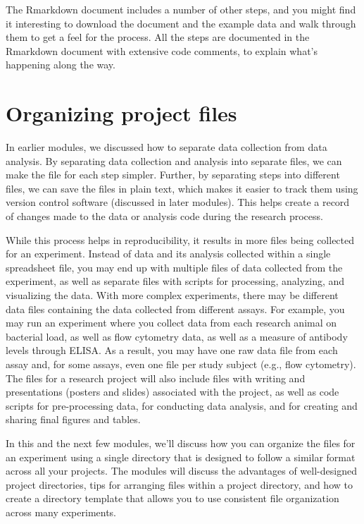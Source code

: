 \documentclass[]{tufte-book}
\begin{document}
The Rmarkdown document includes a number of other steps, and you might find
it interesting to download the document and the example data and walk through
them to get a feel for the process. All the steps are documented in the
Rmarkdown document with extensive code comments, to explain what's happening
along the way.

\section{Organizing project files}\label{module6}

In earlier modules, we discussed how to separate data collection from data
analysis. By separating data collection and analysis into separate files, we can
make the file for each step simpler. Further, by separating steps into different
files, we can save the files in plain text, which makes it easier to track them
using version control software (discussed in later modules). This helps create a
record of changes made to the data or analysis code during the research process.

While this process helps in reproducibility, it results in more files being
collected for an experiment. Instead of data and its analysis collected within a
single spreadsheet file, you may end up with multiple files of data collected
from the experiment, as well as separate files with scripts for processing,
analyzing, and visualizing the data. With more complex experiments, there may be
different data files containing the data collected from different assays. For example,
you may run an experiment where you collect data from each research animal on
bacterial load, as well as flow cytometry data, as well as a measure of antibody
levels through ELISA. As a result, you may have one raw data file from each
assay and, for some assays, even one file per study subject (e.g., flow
cytometry). The files for a research project will also include files with
writing and presentations (posters and slides) associated with the project, as
well as code scripts for pre-processing data, for conducting data analysis, and
for creating and sharing final figures and tables.

In this and the next few modules, we'll discuss how you can organize the files
for an experiment using a single directory that is designed to follow a similar
format across all your projects. The modules will discuss the advantages of
well-designed project directories, tips for arranging files within a project
directory, and how to create a directory template that allows you to use
consistent file organization across many experiments.
\end{document}
